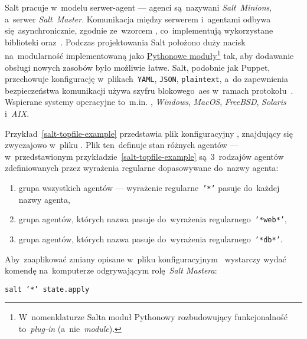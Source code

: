 \documentclass[thesis]{subfiles}
\begin{document}
Salt pracuje w~modelu serwer-agent --- agenci są~nazywani \emph{Salt~Minions}, a~serwer \emph{Salt~Master}. Komunikacja między serwerem i~agentami odbywa się~asynchronicznie, zgodnie ze~wzorcem , co~implementują wykorzystane biblioteki  oraz~. Podczas projektowania Salt położono duży nacisk na~modularność implementowaną jako \href{https://docs.python.org/3.7/tutorial/modules.html}{Pythonowe moduły}\footnote{W~nomenklaturze Salta moduł Pythonowy rozbudowujący funkcjonalność to~\emph{plug-in} (a~nie~\emph{module}).} tak, aby dodawanie obsługi nowych zasobów było możliwie łatwe. Salt, podobnie jak Puppet, przechowuje konfigurację w~plikach~\texttt{YAML}, \texttt{JSON}, \texttt{plaintext}, a~do zapewnienia bezpieczeństwa komunikacji używa szyfru blokowego~\gls{aes} w~ramach protokołu~. Wspierane systemy operacyjne to~m.in. \emph{}, \emph{Windows}, \emph{MacOS}, \emph{FreeBSD}, \emph{Solaris} i~\emph{AIX}.

Przykład~\ref{salt-topfile-example} przedstawia plik konfiguracyjny , znajdujący się zwyczajowo w~pliku . Plik ten~definuje stan różnych agentów --- w~przedstawionym przykładzie~\ref{salt-topfile-example} są~3~rodzajów agentów zdefiniowanych przez wyrażenia regularne dopasowywane do~nazwy agenta:
\begin{enumerate}
	\item grupa wszystkich agentów --- wyrażenie regularne~\texttt{'*'} pasuje do~każdej nazwy agenta,
	\item grupa agentów, których nazwa pasuje do~wyrażenia regularnego~\texttt{'*web*'},
	\item grupa agentów, których nazwa pasuje do~wyrażenia regularnego~\texttt{'*db*'}.
\end{enumerate}
Aby~zaaplikować zmiany opisane w~pliku konfiguracyjnym~ wystarczy wydać komendę na~komputerze odgrywającym rolę~\emph{Salt Mastera}:
\begin{center}
	\texttt{salt '*' state.apply}
\end{center}
\end{document}
